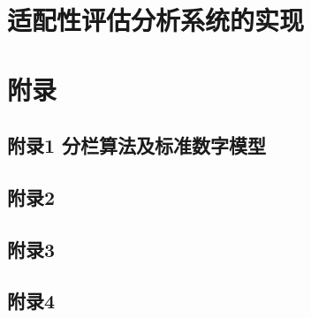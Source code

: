 \documentclass[a4paper,12pt]{ctexbook}	%
\begin{document}
\chapter{适配性评估分析系统的实现}



\backmatter %


\chapter{附录}

\setcounter{secnumdepth}{0}   %
\section{附录1 分栏算法及标准数字模型}
\section{附录2 }
\section{附录3 }
\section{附录4 }
\end{document}

